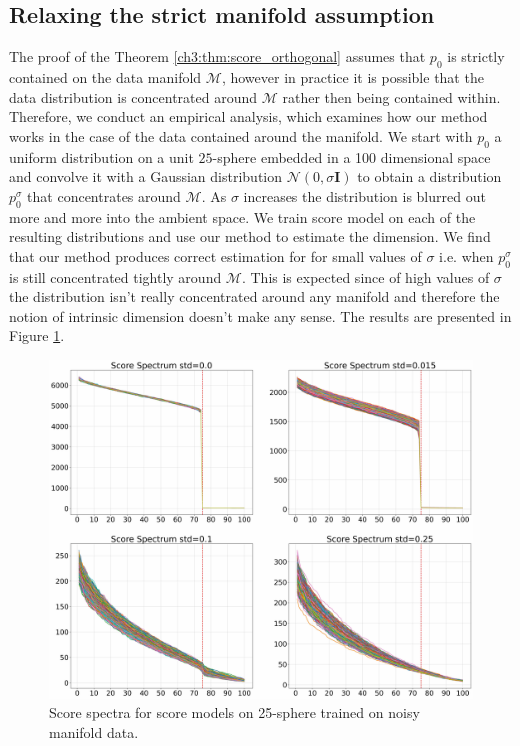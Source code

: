     \subsection{Relaxing the strict manifold assumption}
    The proof of the Theorem \ref{ch3:thm:score_orthogonal} assumes that $p_0$ is strictly contained on the data manifold $\mathcal{M}$, however in practice it is possible that the data distribution is concentrated around $\mathcal{M}$ rather then being contained within. Therefore, we conduct an empirical analysis, which examines how our method works in the case of the data contained around the manifold. We start with $p_0$ a uniform distribution on a unit $25$-sphere embedded in a 100 dimensional space and convolve it with a Gaussian distribution $\mathcal{N}(0, \sigma \mathbf{I})$ to obtain a distribution $p_0^\sigma$ that concentrates around $\mathcal{M}$. As $\sigma$ increases the distribution is blurred out more and more into the ambient space. We train score model on each of the resulting distributions and use our method to estimate the dimension. We find that our method produces correct estimation for for small values of $\sigma$ i.e. when $p_0^\sigma$ is still concentrated tightly around $\mathcal{M}$. This is expected since of high values of $\sigma$ the distribution isn't really concentrated around any manifold and therefore the notion of intrinsic dimension doesn't make any sense. The results are presented in Figure \ref{ch3:fig:robustness_samples}.
    
    \begin{figure}
        \centering
        \includegraphics[width=\textwidth]{chapter3/figures/robustness_samples.jpg}
        \caption{Score spectra for score models on 25-sphere trained on noisy manifold data.}
        \label{ch3:fig:robustness_samples}
    \end{figure}

    
